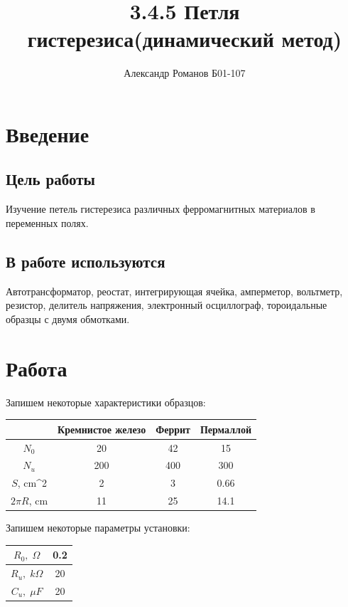 \documentclass{article}
\author{Александр Романов Б01-107}
\title {3.4.5 Петля гистерезиса(динамический метод)}
\date{}
\begin{document}
\maketitle
\section{Введение}
\subsection{Цель работы}
Изучение петель гистерезиса различных ферромагнитных материалов в переменных полях.
\subsection{В работе используются}
Автотрансформатор, реостат, интегрирующая ячейка, амперметор, вольтметр, резистор, делитель напряжения, электронный
осциллограф, тороидальные образцы с двумя обмотками.

\section{Работа}
Запишем  некоторые характеристики образцов:
\begin{table}[H]
\centering
    \begin{tabular}{|c|c|c|c|}
        \hline
                    &Кремнистое железо  &Феррит &Пермаллой\\\hline
        $N_0$         &20                 &42     &15     \\\hline
        $N_u$         &200                &400    &300    \\\hline
        $S$, cm^2     &2                  &3      &0.66   \\\hline
        $2\pi R$, cm  &11                 &25     &14.1   \\\hline
    \end{tabular}
\end{table}
Запишем некоторые параметры установки:
\begin{table}[H]
    \centering
        \begin{tabular}{|c|c|}
            \hline
            $R_0,\; \Omega$&0.2\\\hline
            $R_u,\; k\Omega$&20\\\hline
            $C_u,\; \mu F$  &20\\\hline
        \end{tabular}
    \end{table}
\end{document}

